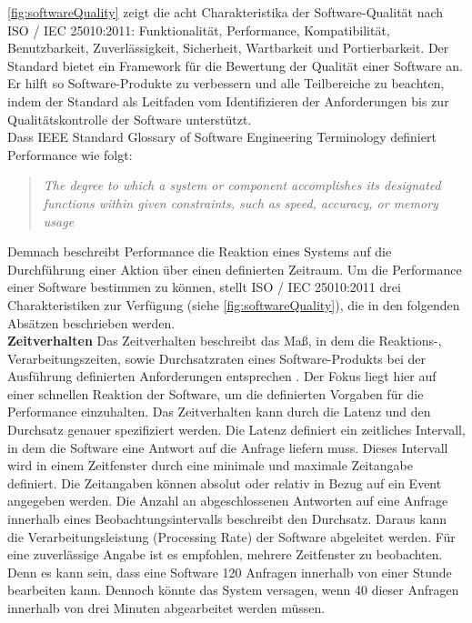 \noindent
\autoref{fig:softwareQuality} zeigt die acht Charakteristika der Software-Qualität nach ISO / IEC 25010:2011: Funktionalität, Performance, Kompatibilität, Benutzbarkeit, Zuverlässigkeit, Sicherheit, Wartbarkeit und Portierbarkeit. Der Standard bietet ein Framework für die Bewertung der Qualität einer Software an. Er hilft so Software-Produkte zu verbessern und alle Teilbereiche zu beachten, indem der Standard als Leitfaden vom Identifizieren der Anforderungen bis zur Qualitätskontrolle der Software unterstützt.\cite{ISOIEC.}\\

\noindent
Dass IEEE Standard Glossary of Software Engineering Terminology definiert Performance wie folgt:
\begin{quote}
	\emph{\grqq{}The degree to which a system or component accomplishes its designated functions within given constraints, such as speed, accuracy, or memory usage\grqq{}} \cite{IEEE.}
\end{quote}

\noindent
Demnach beschreibt Performance die Reaktion eines Systems auf die Durchführung einer Aktion über einen definierten Zeitraum. Um die Performance einer Software bestimmen zu können, stellt ISO / IEC 25010:2011 drei Charakteristiken zur Verfügung (siehe \autoref{fig:softwareQuality}), die in den folgenden Absätzen beschrieben werden.\\

\noindent
\textbf{Zeitverhalten}\newline
Das Zeitverhalten beschreibt das Maß, in dem die Reaktions-, Verarbeitungszeiten, sowie Durchsatzraten eines Software-Produkts bei der Ausführung definierten Anforderungen entsprechen \cite{ISOIEC.}. Der Fokus liegt hier auf einer schnellen Reaktion der Software, um die definierten Vorgaben für die Performance einzuhalten. Das Zeitverhalten kann durch die Latenz und den Durchsatz genauer spezifiziert werden. Die Latenz definiert ein zeitliches Intervall, in dem die Software eine Antwort auf die Anfrage liefern muss. Dieses Intervall wird in einem Zeitfenster durch eine minimale und maximale Zeitangabe definiert. Die Zeitangaben können absolut oder relativ in Bezug auf ein Event angegeben werden. Die Anzahl an abgeschlossenen Antworten auf eine Anfrage innerhalb eines Beobachtungsintervalls beschreibt den Durchsatz. Daraus kann die Verarbeitungsleistung (Processing Rate) der Software abgeleitet werden. Für eine zuverlässige Angabe ist es empfohlen, mehrere Zeitfenster zu beobachten. Denn es kann sein, dass eine Software 120 Anfragen innerhalb von einer Stunde bearbeiten kann. Dennoch könnte das System versagen, wenn 40 dieser Anfragen innerhalb von drei Minuten abgearbeitet werden müssen.\cite{Barbacci.1995}\\

